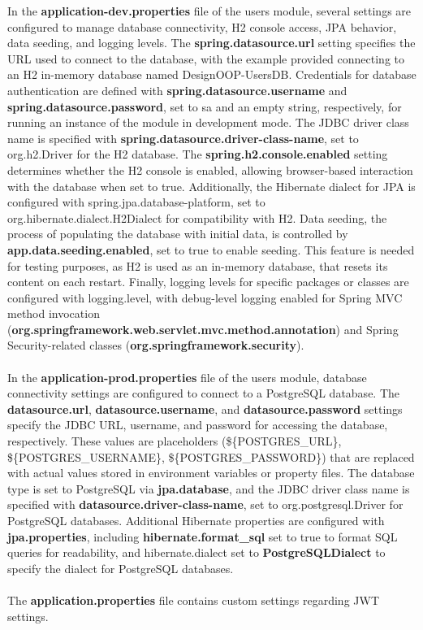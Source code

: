 \noindent In the \textbf{application-dev.properties} file of the users module, several settings are configured to manage database connectivity, H2 console access, JPA behavior, data seeding, and logging levels. The \textbf{spring.datasource.url} setting specifies the URL used to connect to the database, with the example provided connecting to an H2 in-memory database named DesignOOP-UsersDB. Credentials for database authentication are defined with \textbf{spring.datasource.username} and \textbf{spring.datasource.password}, set to sa and an empty string, respectively, for running an instance of the module in development mode. The JDBC driver class name is specified with \textbf{spring.datasource.driver-class-name}, set to org.h2.Driver for the H2 database. The \textbf{spring.h2.console.enabled} setting determines whether the H2 console is enabled, allowing browser-based interaction with the database when set to true. Additionally, the Hibernate dialect for JPA is configured with spring.jpa.database-platform, set to org.hibernate.dialect.H2Dialect for compatibility with H2. Data seeding, the process of populating the database with initial data, is controlled by \textbf{app.data.seeding.enabled}, set to true to enable seeding. This feature is needed for testing purposes, as H2 is used as an in-memory database, that resets its content on each restart. Finally, logging levels for specific packages or classes are configured with logging.level, with debug-level logging enabled for Spring MVC method invocation (\textbf{org.springframework.web.servlet.mvc.method.annotation}) and Spring Security-related classes (\textbf{org.springframework.security}).
\\\\
\noindent In the \textbf{application-prod.properties} file of the users module, database connectivity settings are configured to connect to a PostgreSQL database. The \textbf{datasource.url}, \textbf{datasource.username}, and \textbf{datasource.password} settings specify the JDBC URL, username, and password for accessing the database, respectively. These values are placeholders (\$\{POSTGRES\_URL\}, \$\{POSTGRES\_USERNAME\}, \$\{POSTGRES\_PASSWORD\}) that are replaced with actual values stored in environment variables or property files. The database type is set to PostgreSQL via \textbf{jpa.database}, and the JDBC driver class name is specified with \textbf{datasource.driver-class-name}, set to org.postgresql.Driver for PostgreSQL databases. Additional Hibernate properties are configured with \textbf{jpa.properties}, including \textbf{hibernate.format\_sql} set to true to format SQL queries for readability, and hibernate.dialect set to \textbf{PostgreSQLDialect} to specify the dialect for PostgreSQL databases.
\\\\
\noindent The \textbf{application.properties} file contains custom settings regarding JWT settings.

